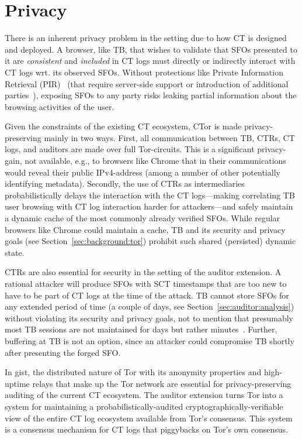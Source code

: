 \section{Privacy} \label{sec:privacy}
There is an inherent privacy problem in the setting due to how CT is designed
and deployed. A browser, like TB, that wishes to validate that SFOs presented to
it are \emph{consistent} and \emph{included} in CT logs must directly or
indirectly interact with CT logs wrt. its observed SFOs. Without protections
like Private Information Retrieval (PIR)~\cite{PIR} (that require server-side
support or introduction of additional parties~\cite{lueks-and-goldberg}),
exposing SFOs to any party risks leaking partial information about the browsing
activities of the user.

Given the constraints of the existing CT ecosystem, CTor is made
privacy-preserving mainly in two ways. First, all communication between TB,
CTRs, CT logs, and auditors are made over full Tor-circuits. This is a
significant privacy-gain, not available, e.g., to browsers like Chrome that in
their communications would reveal their public IPv4-address (among a number of
other potentially identifying metadata). Secondly, the use of CTRs as
intermediaries probabilistically delays the interaction with the CT
logs---making correlating TB user browsing with CT log interaction harder for
attackers---and safely maintain a dynamic cache of the most commonly already
verified SFOs. While regular browsers like Chrome could maintain a cache, TB and
its security and privacy goals (see Section~\ref{sec:background:tor}) prohibit
such shared (persisted) dynamic state.

CTRs are also essential for security in the setting of the auditor extension. A
rational attacker will produce SFOs with SCT timestamps that are too new to have
to be part of CT logs at the time of the attack. TB cannot store SFOs for any
extended period of time (a couple of days, see
Section~\ref{sec:auditor:analysis}) without violating its security and privacy
goals, not to mention that presumably most TB sessions are not maintained for
days but rather minutes~\cite{DBLP:conf/pam/AmannS16}. Further, buffering at TB
is not an option, since an attacker could compromise TB shortly after presenting
the forged SFO.

In gist, the distributed nature of Tor with its anonymity properties and
high-uptime relays that make up the Tor network are essential for
privacy-preserving auditing of the current CT ecosystem. The auditor extension
turns Tor into a system for maintaining a probabilistically-audited
cryptographically-verifiable view of the entire CT log ecosystem available from
Tor’s consensus. This system is a consensus mechanism for CT logs that
piggybacks on Tor's own consensus.

